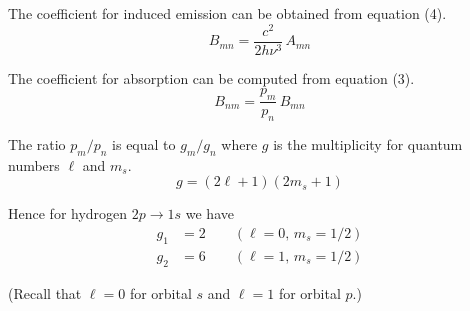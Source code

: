 \documentclass[12pt]{article}
\newcommand\BNM{B_{nm}} %
\newcommand\BMN{B_{mn}} %
\newcommand\AMN{A_{mn}} %
\begin{document}
The coefficient for induced emission can be obtained from equation (4).
\begin{equation*}
\BMN=\frac{c^2}{2h\nu^3}\,\AMN
\end{equation*}

The coefficient for absorption can be computed from equation (3).
\begin{equation*}
\BNM=\frac{p_m}{p_n}\,\BMN
\end{equation*}

The ratio $p_m/p_n$ is equal to $g_m/g_n$ where $g$ is the multiplicity
for quantum numbers $\ell$ and $m_s$.
\begin{equation*}
g=(2\ell+1)(2m_s+1)
\end{equation*}

Hence for hydrogen $2p\rightarrow1s$ we have
\begin{align*}
g_1&=2\qquad(\ell=0,\,m_s=1/2)
\\
g_2&=6\qquad(\ell=1,\,m_s=1/2)
\end{align*}

(Recall that $\ell=0$ for orbital $s$ and $\ell=1$ for orbital $p$.)
\end{document}
